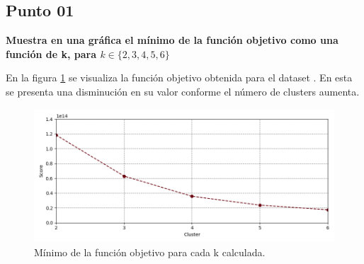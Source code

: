 \subsection*{Punto 01}

\textbf{Muestra en una gráfica el mínimo de la función objetivo como una función de k, para $k \in \{2, 3, 4, 5, 6\}$}

En la figura \ref{fig:problema_05_minimum_score} se visualiza la función objetivo obtenida para el dataset . En esta se presenta una disminución en su valor conforme el número de clusters aumenta.

\begin{figure}[H]
    \centering
    \includegraphics[width=16cm]{Graphics/Problema_05/minumum_score.png}
    \caption{Mínimo de la función objetivo para cada k calculada.}
    \label{fig:problema_05_minimum_score}
\end{figure}